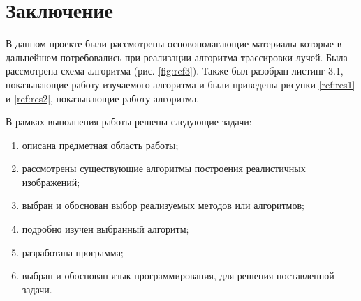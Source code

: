 \chapter*{Заключение}

В данном проекте были рассмотрены
основополагающие материалы которые в дальнейшем потребовались
при реализации алгоритма трассировки лучей.
Была рассмотрена схема алгоритма (рис. \ref{fig:ref3}).
Также был разобран листинг 3.1,
показывающие работу изучаемого алгоритма
и были приведены рисунки \ref{ref:res1} и \ref{ref:res2},
показывающие работу алгоритма.

В рамках выполнения работы решены следующие задачи:

\begin{enumerate}
	\item описана предметная область работы;
	\item рассмотрены существующие алгоритмы построения реалистичных изображений;
	\item выбран и обоснован выбор реализуемых методов или алгоритмов;
	\item подробно изучен выбранный алгоритм;
	\item разработана программа;
	\item выбран и обоснован язык программирования, для решения поставленной задачи.
\end{enumerate}

